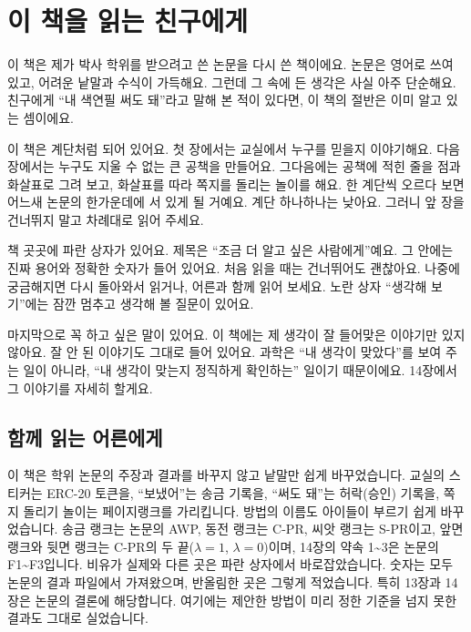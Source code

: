 \chapter*{이 책을 읽는 친구에게}

이 책은 제가 박사 학위를 받으려고 쓴 논문을 다시 쓴 책이에요.
논문은 영어로 쓰여 있고, 어려운 낱말과 수식이 가득해요.
그런데 그 속에 든 생각은 사실 아주 단순해요.
친구에게 “내 색연필 써도 돼”라고 말해 본 적이 있다면, 이 책의 절반은 이미 알고 있는 셈이에요.

이 책은 계단처럼 되어 있어요.
첫 장에서는 교실에서 누구를 믿을지 이야기해요.
다음 장에서는 누구도 지울 수 없는 큰 공책을 만들어요.
그다음에는 공책에 적힌 줄을 점과 화살표로 그려 보고, 화살표를 따라 쪽지를 돌리는 놀이를 해요.
한 계단씩 오르다 보면 어느새 논문의 한가운데에 서 있게 될 거예요.
계단 하나하나는 낮아요.
그러니 앞 장을 건너뛰지 말고 차례대로 읽어 주세요.

책 곳곳에 파란 상자가 있어요.
제목은 “조금 더 알고 싶은 사람에게”예요.
그 안에는 진짜 용어와 정확한 숫자가 들어 있어요.
처음 읽을 때는 건너뛰어도 괜찮아요.
나중에 궁금해지면 다시 돌아와서 읽거나, 어른과 함께 읽어 보세요.
노란 상자 “생각해 보기”에는 잠깐 멈추고 생각해 볼 질문이 있어요.

마지막으로 꼭 하고 싶은 말이 있어요.
이 책에는 제 생각이 잘 들어맞은 이야기만 있지 않아요.
잘 안 된 이야기도 그대로 들어 있어요.
과학은 “내 생각이 맞았다”를 보여 주는 일이 아니라,
“내 생각이 맞는지 정직하게 확인하는” 일이기 때문이에요.
14장에서 그 이야기를 자세히 할게요.

\section{함께 읽는 어른에게}

이 책은 학위 논문의 주장과 결과를 바꾸지 않고 낱말만 쉽게 바꾸었습니다.
교실의 스티커는 ERC-20 토큰을, “보냈어”는 송금 기록을, “써도 돼”는 허락(승인) 기록을, 쪽지 돌리기 놀이는 페이지랭크를 가리킵니다.
방법의 이름도 아이들이 부르기 쉽게 바꾸었습니다.
송금 랭크는 논문의 AWP, 동전 랭크는 C-PR, 씨앗 랭크는 S-PR이고, 앞면 랭크와 뒷면 랭크는 C-PR의 두 끝($\lambda=1$, $\lambda=0$)이며, 14장의 약속 1\textasciitilde{}3은 논문의 F1\textasciitilde{}F3입니다.
비유가 실제와 다른 곳은 파란 상자에서 바로잡았습니다.
숫자는 모두 논문의 결과 파일에서 가져왔으며, 반올림한 곳은 그렇게 적었습니다.
특히 13장과 14장은 논문의 결론에 해당합니다.
여기에는 제안한 방법이 미리 정한 기준을 넘지 못한 결과도 그대로 실었습니다.
